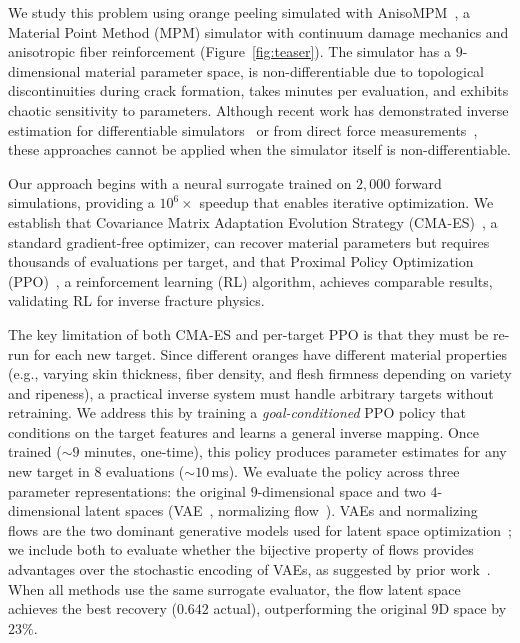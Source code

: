 We study this problem using orange peeling simulated with AnisoMPM~\cite{wolper2020anisompm}, a Material Point Method (MPM) simulator with continuum damage mechanics and anisotropic fiber reinforcement (Figure~\ref{fig:teaser}). The simulator has a $9$-dimensional material parameter space, is non-differentiable due to topological discontinuities during crack formation, takes minutes per evaluation, and exhibits chaotic sensitivity to parameters. Although recent work has demonstrated inverse estimation for differentiable simulators~\cite{ma2023nclaw, heiden2021disect} or from direct force measurements~\cite{beltran2024sliceit}, these approaches cannot be applied when the simulator itself is non-differentiable.

Our approach begins with a neural surrogate trained on $2{,}000$ forward simulations, providing a $10^6\times$ speedup that enables iterative optimization. We establish that Covariance Matrix Adaptation Evolution Strategy (CMA-ES)~\cite{hansen2001cmaes}, a standard gradient-free optimizer, can recover material parameters but requires thousands of evaluations per target, and that Proximal Policy Optimization (PPO)~\cite{schulman2017ppo}, a reinforcement learning (RL) algorithm, achieves comparable results, validating RL for inverse fracture physics.

The key limitation of both CMA-ES and per-target PPO is that they must be re-run for each new target. Since different oranges have different material properties (e.g., varying skin thickness, fiber density, and flesh firmness depending on variety and ripeness), a practical inverse system must handle arbitrary targets without retraining. We address this by training a \emph{goal-conditioned} PPO policy that conditions on the target features and learns a general inverse mapping. Once trained (${\sim}9$ minutes, one-time), this policy produces parameter estimates for any new target in $8$ evaluations (${\sim}10$\,ms). We evaluate the policy across three parameter representations: the original $9$-dimensional space and two $4$-dimensional latent spaces (VAE~\cite{kingma2014vae}, normalizing flow~\cite{dinh2017realnvp}). VAEs and normalizing flows are the two dominant generative models used for latent space optimization~\cite{gomez2018automatic, tripp2020sample, lee2025nfbo, maus2022lolbo}; we include both to evaluate whether the bijective property of flows provides advantages over the stochastic encoding of VAEs, as suggested by prior work~\cite{lee2025nfbo}. When all methods use the same surrogate evaluator, the flow latent space achieves the best recovery ($0.642$ actual), outperforming the original $9$D space by $23\%$.


